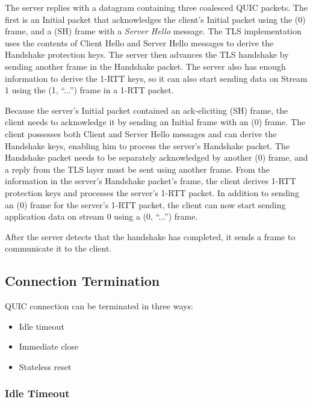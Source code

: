 The server replies with a datagram containing three coalesced QUIC packets. The first is an Initial
packet that acknowledges the client's Initial packet using the \ACK{}(0) frame, and a \CRYPTO{}(SH)
frame with a \textit{Server Hello} message. The TLS implementation uses the contents of Client Hello
and Server Hello messages to derive the Handshake protection keys. The server then advances the TLS
handshake by sending another \CRYPTO{} frame in the Handshake packet. The server also has enough
information to derive the 1-RTT keys, so it can also start sending data on Stream 1 using the
\STREAM{}(1, ``...'') frame in a 1-RTT packet.

Because the server's Initial packet contained an ack-eliciting \CRYPTO{}(SH) frame, the client needs
to acknowledge it by sending an Initial frame with an \ACK{}(0) frame. The client possesses both
Client and Server Hello messages and can derive the Handshake keys, enabling him to process the
server's Handshake packet. The Handshake packet needs to be separately acknowledged by another
\ACK{}(0) frame, and a reply from the TLS layer must be sent using another \CRYPTO{} frame. From the
information in the server's Handshake packet's \CRYPTO{} frame, the client derives 1-RTT protection
keys and processes the server's 1-RTT packet. In addition to sending an \ACK{}(0) frame for the
server's 1-RTT packet, the client can now start sending application data on stream 0 using a
\STREAM{}(0, ``...'') frame.

After the server detects that the handshake has completed, it sends a \HANDSHAKEDONE{} frame to
communicate it to the client.

\subsection{Connection Termination}

QUIC connection can be terminated in three ways:

\begin{itemize}

  \item Idle timeout

  \item Immediate close

  \item Stateless reset

\end{itemize}

\subsubsection{Idle Timeout}\label{sec:02-idle-timeout}


